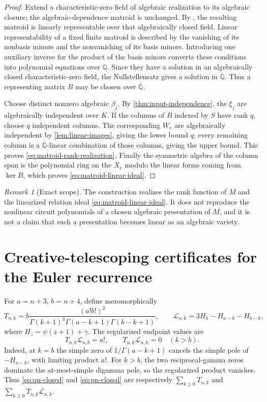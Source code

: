 \documentclass[11pt]{article}
\theoremstyle{definition}
\theoremstyle{remark}
\newtheorem{remark}[theorem]{Remark}
\newcommand{\Q}{\mathbb Q}
\newcommand{\Qbar}{\overline{\mathbb Q}}
\begin{document}
\begin{proof}
Extend a characteristic-zero field of algebraic realization to its
algebraic closure; the algebraic-dependence matroid is unchanged.  By
\cite[Thm.~1.10]{RosenSidmanTheran2025}, the resulting matroid is linearly
representable over that algebraically closed field.  Linear
representability of a fixed finite
matroid is described by the vanishing of its nonbasis minors and the
nonvanishing of its basis minors.  Introducing one auxiliary inverse for
the product of the basis minors converts these conditions into polynomial
equations over \(\Q\).  Since they have a solution in an algebraically
closed characteristic-zero field, the Nullstellensatz gives a solution in
\(\Qbar\).  Thus a representing matrix \(B\) may be chosen over \(\Qbar\).

Choose distinct nonzero algebraic \(\beta_j\).  By
\cref{thm:input-independence}, the \(\xi_j\) are algebraically independent
over \(K\).  If the columns of \(B\) indexed by \(S\) have rank \(q\),
choose \(q\) independent columns.  The corresponding \(W_e\) are
algebraically independent by \cref{lem:linear-images}, giving the lower
bound \(q\); every remaining column is a \(\Qbar\)-linear combination of
those columns, giving the upper bound.  This proves
\eqref{eq:matroid-rank-realization}.  Finally the symmetric algebra of the
column span is the polynomial ring on the \(X_e\) modulo the linear forms
coming from \(\ker B\), which proves \eqref{eq:matroid-linear-ideal}.
\end{proof}

\begin{remark}[Exact scope]
The construction realizes the rank function of \(M\) and the linearized
relation ideal \eqref{eq:matroid-linear-ideal}.  It does not reproduce the
nonlinear circuit polynomials of a chosen algebraic presentation of
\(M\), and it is not a claim that such a presentation becomes linear as an
algebraic variety.
\end{remark}

\section{Creative-telescoping certificates for the Euler recurrence}
\label{app:telescopers}

For \(a=n+3\), \(b=n+4\), define meromorphically
\[
 T_{n,k}=b\frac{(a!b!)^2}
 {\Gamma(k+1)^3\Gamma(a-k+1)\Gamma(b-k+1)},
 \qquad
 \mathcal L_{n,k}=3H_k-H_{a-k}-H_{b-k},
\]
where \(H_z=\psi(z+1)+\gamma\).  The regularized endpoint values are
\[
 T_{n,b}\mathcal L_{n,b}=a!,
 \qquad
 T_{n,k}\mathcal L_{n,k}=0\quad(k>b).
\]
Indeed, at \(k=b\) the simple zero of
\(1/\Gamma(a-k+1)\) cancels the simple pole of
\(-H_{a-k}\), with limiting product \(a!\).  For \(k>b\), the two
reciprocal-gamma zeros dominate the at-most-simple digamma pole, so the
regularized product vanishes.
Thus \eqref{eq:qn-closed} and \eqref{eq:pn-closed} are respectively
\(\sum_{k\ge0}T_{n,k}\) and
\(\sum_{k\ge0}T_{n,k}\mathcal L_{n,k}\).
\end{document}
